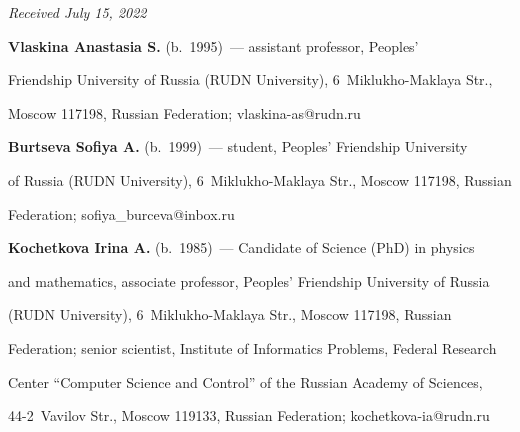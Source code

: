 \vspace*{-6pt}





\hfill{\small\textit{Received July 15, 2022}}


  


  \Contr


  


  \noindent


  \textbf{Vlaskina Anastasia S.} (b.\ 1995)~--- assistant professor, Peoples' 


Friendship University of Russia (RUDN University), 6~Miklukho-Maklaya Str., 


Moscow 117198, Russian Federation; \mbox{vlaskina-as@rudn.ru}


  


  \vspace*{3pt}


  


  \noindent


  \textbf{Burtseva Sofiya A.} (b.\ 1999)~--- student, Peoples' Friendship University 


of Russia (RUDN University), 6~Miklukho-Maklaya Str., Moscow 117198, Russian 


Federation; \mbox{sofiya\_burceva@inbox.ru}


  


  \vspace*{3pt}


  


  \noindent


  \textbf{Kochetkova Irina A.} (b.\ 1985)~--- Candidate of Science (PhD) in physics 


and mathematics, associate professor, Peoples' Friendship University of Russia 


(RUDN University), 6~Miklukho-Maklaya Str., Moscow 117198, Russian 


Federation; senior scientist, Institute of Informatics Problems, Federal Research 


Center ``Computer Science and Control'' of the Russian Academy of Sciences, 


44-2~Vavilov Str., Moscow 119133, Russian Federation; \mbox{kochetkova-ia@rudn.ru}


